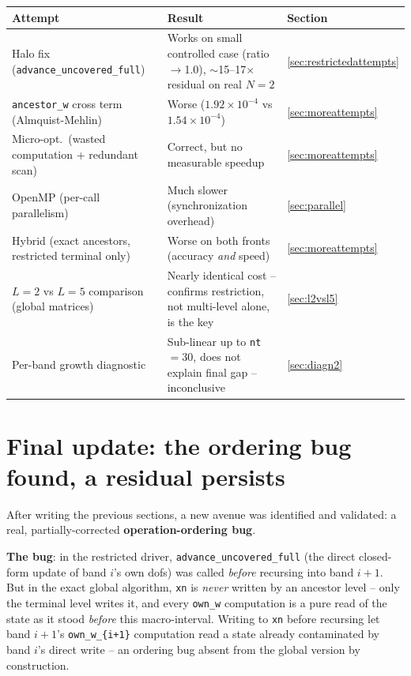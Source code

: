 \documentclass[11pt]{article}
\begin{document}
\begin{center}
\begin{tabular}{@{}p{5.2cm}p{4cm}p{4.8cm}@{}}
\toprule
Attempt & Result & Section \\
\midrule
Halo fix (\texttt{advance\_uncovered\_full}) & Works on small controlled case (ratio $\to$1.0), $\sim$15--17$\times$ residual on real $N{=}2$ & \ref{sec:restrictedattempts} \\
\texttt{ancestor\_w} cross term (Almquist-Mehlin) & Worse ($1.92\times10^{-4}$ vs $1.54\times10^{-4}$) & \ref{sec:moreattempts} \\
Micro-opt.\ (wasted computation + redundant scan) & Correct, but no measurable speedup & \ref{sec:moreattempts} \\
OpenMP (per-call parallelism) & Much slower (synchronization overhead) & \ref{sec:parallel} \\
Hybrid (exact ancestors, restricted terminal only) & Worse on both fronts (accuracy \emph{and} speed) & \ref{sec:moreattempts} \\
$L{=}2$ vs $L{=}5$ comparison (global matrices) & Nearly identical cost -- confirms restriction, not multi-level alone, is the key & \ref{sec:l2vsl5} \\
Per-band growth diagnostic & Sub-linear up to \texttt{nt}$=30$, does not explain final gap -- inconclusive & \ref{sec:diagn2} \\
\bottomrule
\end{tabular}
\end{center}

\section{Final update: the ordering bug found, a residual persists}
\label{sec:orderingfix}

After writing the previous sections, a new avenue was identified and
validated: a real, partially-corrected \textbf{operation-ordering bug}.

\textbf{The bug}: in the restricted driver, \texttt{advance\_uncovered\_full}
(the direct closed-form update of band $i$'s own dofs) was called
\emph{before} recursing into band $i+1$. But in the exact global
algorithm, \texttt{xn} is \emph{never} written by an ancestor level --
only the terminal level writes it, and every \texttt{own\_w}
computation is a pure read of the state as it stood \emph{before} this
macro-interval. Writing to \texttt{xn} before recursing let band
$i+1$'s \texttt{own\_w\_\{i+1\}} computation read a state already
contaminated by band $i$'s direct write -- an ordering bug absent from
the global version by construction.
\end{document}
